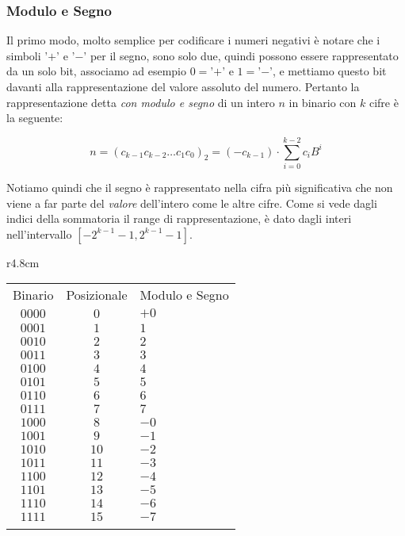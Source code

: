 \subsubsection{Modulo e Segno}

Il primo modo, molto semplice per codificare i numeri negativi è notare che i simboli '$+$' e '$-$' per il segno, sono solo due, quindi possono essere rappresentato da un solo bit, associamo ad esempio $0 = $'$+$' e $1 = $'$-$', e mettiamo questo bit davanti alla rappresentazione del valore assoluto del numero. Pertanto la rappresentazione detta \emph{con modulo e segno} di un intero $n$ in binario con $k$ cifre è la seguente:

\[ n = (c_{k-1}c_{k-2}{\ldots}c_1c_0)_2 = (-c_{k-1}) \cdot \sum_{i=0}^{k-2}c_iB^i \]

Notiamo quindi che il segno è rappresentato nella cifra più significativa che  non viene a far parte del \emph{valore} dell'intero come le altre cifre. Come si vede dagli indici della sommatoria il range di rappresentazione, è dato dagli interi nell'intervallo $[-2^{k-1}-1,2^{k-1}-1]$.

\begin{wraptable}[18]{r}{4.8cm}\footnotesize \sffamily 
\begin{tabular}{c|c|p{1.2cm}}
	Binario & Posizionale & Modulo e Segno\\ \noalign{\smallskip}
	\hline \noalign{\smallskip}
	$0000$ & $0$ & $+0$\\
	$0001$ & $1$ & \hspace{2ex}$1$\\ 
	$0010$ & $2$ & \hspace{2ex}$2$\\ 
	$0011$ & $3$ & \hspace{2ex}$3$\\ 
	$0100$ & $4$ & \hspace{2ex}$4$\\ 
	$0101$ & $5$ & \hspace{2ex}$5$\\
	$0110$ & $6$ & \hspace{2ex}$6$\\
	$0111$ & $7$ & \hspace{2ex}$7$\\
	$1000$ & $8$ & $-0$\\
	$1001$ & $9$ & $-1$\\
	$1010$ & $10$ & $-2$\\
	$1011$ & $11$ & $-3$\\
	$1100$ & $12$ & $-4$\\
	$1101$ & $13$ & $-5$\\
	$1110$ & $14$ & $-6$\\
	$1111$ & $15$ & $-7$\\ \noalign{\smallskip}
	\hline
\end{tabular}
\end{wraptable}

